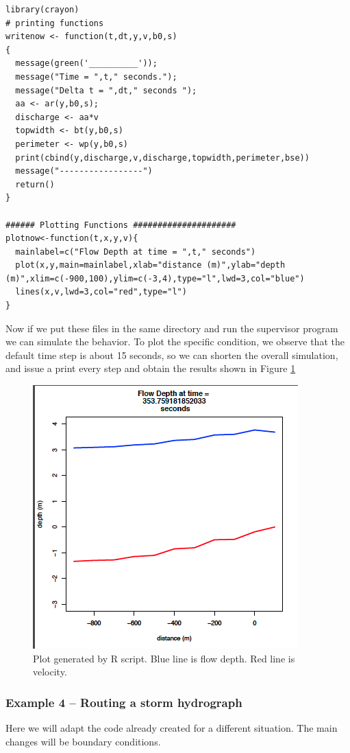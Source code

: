 \begin{lstlisting}[caption=R code for Printing and Graphing for Example 1, label=lst:example1prt]
library(crayon)
# printing functions
writenow <- function(t,dt,y,v,b0,s)
{
  message(green('__________'));
  message("Time = ",t," seconds.");
  message("Delta t = ",dt," seconds ");
  aa <- ar(y,b0,s);
  discharge <- aa*v
  topwidth <- bt(y,b0,s)
  perimeter <- wp(y,b0,s)
  print(cbind(y,discharge,v,discharge,topwidth,perimeter,bse))
  message("-----------------")
  return()
}

###### Plotting Functions #####################
plotnow<-function(t,x,y,v){
  mainlabel=c("Flow Depth at time = ",t," seconds")
  plot(x,y,main=mainlabel,xlab="distance (m)",ylab="depth (m)",xlim=c(-900,100),ylim=c(-3,4),type="l",lwd=3,col="blue")
  lines(x,v,lwd=3,col="red",type="l")
}
\end{lstlisting}
Now if we put these files in the same directory and run the supervisor program we can simulate the behavior.
To plot the specific condition, we observe that the default time step is about 15 seconds, so we can shorten the overall simulation, and issue a print every step and obtain the results shown in Figure \ref{fig:example1}
\begin{figure}[h!] %
   \centering
   \includegraphics[height=3.in]{example1.png} 
   \caption{Plot generated by R script.  Blue line is flow depth. Red line is velocity.}
   \label{fig:example1}
\end{figure}
\clearpage

\subsubsection{Example 4 -- Routing a storm hydrograph}
Here we will adapt the code already created for a different situation. 
The main changes will be boundary conditions.

